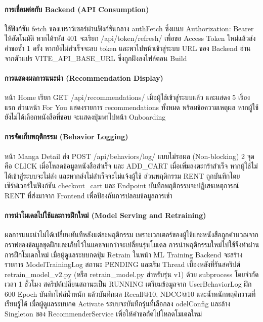 \paragraph{การเชื่อมต่อกับ Backend (API Consumption)}
ใช้ฟังก์ชัน fetch ของเบราว์เซอร์ผ่านฟังก์ชันกลาง authFetch ซึ่งแนบ Authorization: Bearer ให้อัตโนมัติ หากได้รหัส 401 จะเรียก /api/token/refresh/ เพื่อขอ Access Token ใหม่แล้วส่งคำขอซ้ำ 1 ครั้ง หากยังไม่สำเร็จจะลบ token และพาไปหน้าเข้าสู่ระบบ URL ของ Backend อ่านจากตัวแปร VITE\_API\_BASE\_URL ซึ่งถูกฝังลงไฟล์ตอน Build

\paragraph{การแสดงผลการแนะนำ (Recommendation Display)}
หน้า Home เรียก GET /api/recommendations/ เมื่อผู้ใช้เข้าสู่ระบบแล้ว และแสดง 5 เรื่องแรก ส่วนหน้า For You แสดงรายการ recommendations ทั้งหมด พร้อมข้อความเหตุผล หากผู้ใช้ยังไม่ได้เลือกหนังสือที่ชอบ จะแสดงปุ่มพาไปหน้า Onboarding

\paragraph{การจัดเก็บพฤติกรรม (Behavior Logging)}
หน้า Manga Detail ส่ง POST /api/behaviors/log/ แบบไม่รอผล (Non-blocking) 2 จุด คือ CLICK เมื่อโหลดข้อมูลหนังสือสำเร็จ และ ADD\_CART เมื่อเพิ่มลงตะกร้าสำเร็จ หากผู้ใช้ไม่ได้เข้าสู่ระบบจะไม่ส่ง และหากส่งไม่สำเร็จจะไม่แจ้งผู้ใช้ ส่วนพฤติกรรม RENT ถูกบันทึกโดยเซิร์ฟเวอร์ในฟังก์ชัน checkout\_cart และ Endpoint บันทึกพฤติกรรมจะปฏิเสธเหตุการณ์ RENT ที่ส่งมาจาก Frontend เพื่อป้องกันการปลอมข้อมูลการเช่า

\paragraph{การนำโมเดลไปใช้และการฝึกใหม่ (Model Serving and Retraining)}
ผลการแนะนำไม่ได้เปลี่ยนทันทีหลังแต่ละพฤติกรรม เพราะเวกเตอร์ของผู้ใช้และหนังสือถูกคำนวณจากกราฟของข้อมูลชุดฝึกและเก็บไว้ในแคชจนกว่าจะเปลี่ยนรุ่นโมเดล การนำพฤติกรรมใหม่ไปใช้จึงทำผ่านการฝึกโมเดลใหม่ เมื่อผู้ดูแลระบบกดปุ่ม Retrain ในหน้า ML Training Backend จะสร้างรายการ ModelTrainingLog สถานะ PENDING และเริ่ม Thread เบื้องหลังที่รันสคริปต์ retrain\_model\_v2.py (หรือ retrain\_model.py สำหรับรุ่น v1) ด้วย subprocess โดยจำกัดเวลา 1 ชั่วโมง สคริปต์เปลี่ยนสถานะเป็น RUNNING เตรียมข้อมูลจาก UserBehaviorLog ฝึก 600 Epoch บันทึกไฟล์น้ำหนัก แล้วบันทึกผล Recall@10, NDCG@10 และน้ำหนักพฤติกรรมที่เรียนรู้ได้ เมื่อผู้ดูแลระบบกด Activate ระบบจะบันทึกรุ่นที่เลือกลง odelConfig และล้าง Singleton ของ RecommenderService เพื่อให้คำขอถัดไปโหลดโมเดลใหม่

